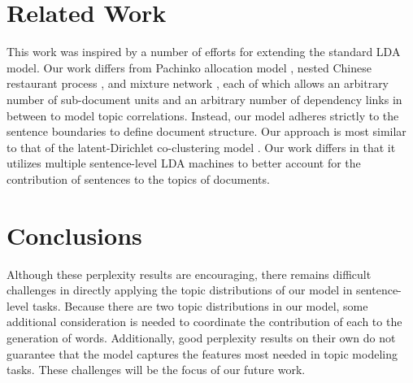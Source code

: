 % 

\section{Related Work} \label{s:related-work} 

This work was inspired by a number of efforts for extending the standard LDA
model.  Our work differs from Pachinko allocation model \cite{li2006pachinko},
nested Chinese restaurant process \cite{blei2004hierarchical}, and mixture
network \cite{heinrich2009generic}, each of which allows an arbitrary number of
sub-document units and an arbitrary number of dependency links in between to
model topic correlations.  Instead, our model adheres strictly to the sentence
boundaries to define document structure.  Our approach is most similar to that
of the latent-Dirichlet co-clustering model \cite{shafiei2006latent}.  Our work
differs in that it utilizes multiple sentence-level LDA machines to better
account for the contribution of sentences to the topics of documents.

\section{Conclusions} \label{s:discussion} 

Although these perplexity results are encouraging, there remains difficult
challenges in directly applying the topic distributions of our model in
sentence-level tasks.  Because there are two topic distributions in our model,
some additional consideration is needed to coordinate the contribution of each
to the generation of words.  Additionally, good perplexity results on their own
do not guarantee that the model captures the features most needed in topic
  modeling tasks.  These challenges will be the focus of our future work.

